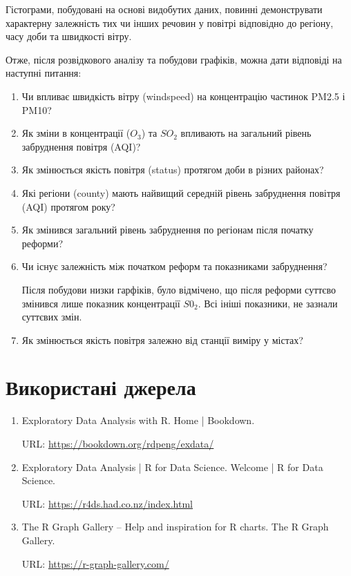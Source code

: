 \documentclass{article}
\begin{document}

Гістограми, побудовані на основі видобутих даних, повинні демонструвати характерну залежність тих чи інших речовин у повітрі відповідно до регіону, часу доби та швидкості вітру.

Отже, після розвідкового аналізу та побудови графіків, можна дати відповіді на наступні питання:
\begin{enumerate}
    \item Чи впливає швидкість вітру (windspeed) на концентрацію частинок PM2.5 і PM10?

    \item Як зміни в концентрації  ($O_3$)  та $SO_2$ впливають на загальний рівень забруднення повітря (AQI)?

    \item Як змінюється якість повітря (status) протягом доби в різних районах?

    \item Які регіони (county) мають найвищий середній рівень забруднення повітря (AQI) протягом року?

    \item Як змінився загальний рівень забруднення по регіонам після початку реформи?

    \item Чи існує залежність між початком реформ та показниками забруднення?

    Після побудови низки гарфіків, було відмічено, що після реформи суттєво змінився лише показник концентрації $S0_2$. Всі ініші показники, не зазнали суттєвих змін.

    \item Як змінюється якість повітря залежно від станції виміру у містах?

\end{enumerate}

\newpage
\section{Використані джерела}
\begin{enumerate}
    \item Exploratory Data Analysis with R. Home | Bookdown.

    URL:  \href{https://bookdown.org/rdpeng/exdata/}{https://bookdown.org/rdpeng/exdata/}

    \item Exploratory Data Analysis | R for Data Science. Welcome | R for Data Science.

    URL: \href{https://r4ds.had.co.nz/index.html}{https://r4ds.had.co.nz/index.html}
    \item The R Graph Gallery – Help and inspiration for R charts. The R Graph Gallery.

    URL: \href{ https://r-graph-gallery.com/}{ https://r-graph-gallery.com/ }
\end{enumerate}
\end{document}
